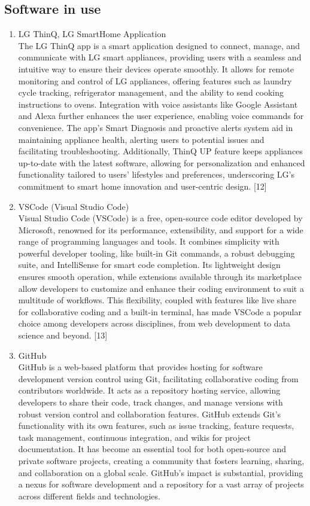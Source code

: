 \documentclass[conference]{IEEEtran}
\begin{document}
\subsection{\large{Software in use}}
\begin{enumerate}[label=\arabic*.]
\item LG ThinQ, LG SmartHome Application\\
The LG ThinQ app is a smart application designed to connect, manage, and communicate with LG smart appliances, providing users with a seamless and intuitive way to ensure their devices operate smoothly. It allows for remote monitoring and control of LG appliances, offering features such as laundry cycle tracking, refrigerator management, and the ability to send cooking instructions to ovens. Integration with voice assistants like Google Assistant and Alexa further enhances the user experience, enabling voice commands for convenience. The app's Smart Diagnosis and proactive alerts system aid in maintaining appliance health, alerting users to potential issues and facilitating troubleshooting. Additionally, ThinQ UP feature keeps appliances up-to-date with the latest software, allowing for personalization and enhanced functionality tailored to users' lifestyles and preferences, underscoring LG's commitment to smart home innovation and user-centric design. [12]\\
\item VSCode (Visual Studio Code)\\
Visual Studio Code (VSCode) is a free, open-source code editor developed by Microsoft, renowned for its performance, extensibility, and support for a wide range of programming languages and tools. It combines simplicity with powerful developer tooling, like built-in Git commands, a robust debugging suite, and IntelliSense for smart code completion. Its lightweight design ensures smooth operation, while extensions available through its marketplace allow developers to customize and enhance their coding environment to suit a multitude of workflows. This flexibility, coupled with features like live share for collaborative coding and a built-in terminal, has made VSCode a popular choice among developers across disciplines, from web development to data science and beyond. [13]\\
\item GitHub\\
GitHub is a web-based platform that provides hosting for software development version control using Git, facilitating collaborative coding from contributors worldwide. It acts as a repository hosting service, allowing developers to share their code, track changes, and manage versions with robust version control and collaboration features. GitHub extends Git's functionality with its own features, such as issue tracking, feature requests, task management, continuous integration, and wikis for project documentation. It has become an essential tool for both open-source and private software projects, creating a community that fosters learning, sharing, and collaboration on a global scale. GitHub's impact is substantial, providing a nexus for software development and a repository for a vast array of projects across different fields and technologies.\\

\end{enumerate}
\end{document}
